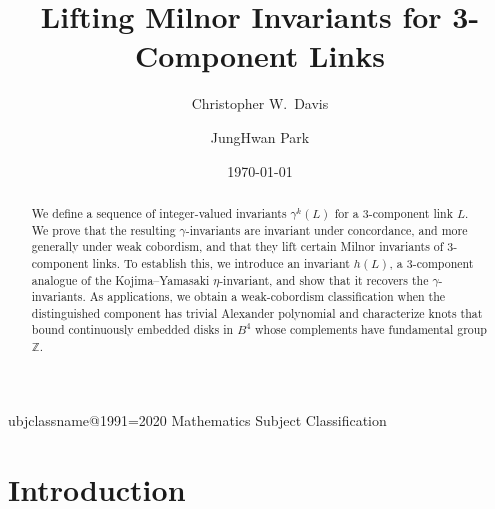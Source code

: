 \documentclass[a4paper, 11pt]{amsart}
\theoremstyle{definition}
\begin{document}
\title[Lifting Milnor Invariants for 3-Component Links]{Lifting Milnor Invariants for 3-Component Links}

\author{Christopher W.\ Davis}
\address{Department of Mathematics, University of Wisconsin--Eau Claire}



\author{JungHwan Park}
\address{Department of Mathematical Sciences, KAIST}




\date{\today}

\def\subjclassname{\textup{2020} Mathematics Subject Classification}
\expandafter\let\csname subjclassname@1991\endcsname=\subjclassname
{}

\begin{abstract}
We define a sequence of integer-valued invariants $\gamma^k(L)$ for a $3$-component link $L$. We prove that the resulting $\gamma$-invariants are invariant under concordance, and more generally under weak cobordism, and that they lift
certain Milnor invariants of 3-component links. To establish this, we introduce an invariant $h(L)$, a $3$-component analogue of the Kojima--Yamasaki $\eta$-invariant, and show that it recovers the $\gamma$-invariants. As applications, we obtain a weak-cobordism classification when the distinguished component has trivial Alexander polynomial and characterize knots that bound continuously embedded disks in $B^4$ whose complements have fundamental group $\mathbb{Z}$.
\end{abstract}




\maketitle

\section{Introduction}
\end{document}
